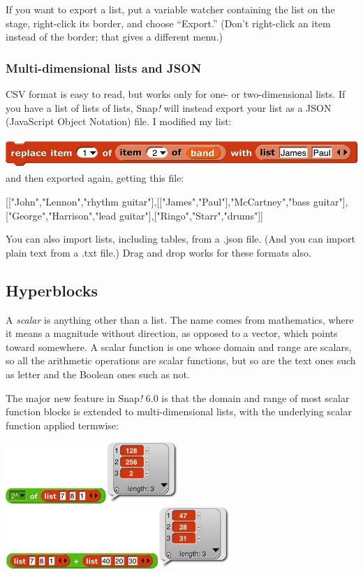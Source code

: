 If you want to export a list, put a variable watcher containing the list
on the stage, right-click its border, and choose ``Export.'' (Don't
right-click an item instead of the border; that gives a different menu.)

\subsubsection{Multi-dimensional lists and
JSON}\label{multi-dimensional-lists-and-json}

CSV format is easy to read, but works only for one- or two-dimensional
lists. If you have a list of lists of lists, Snap\emph{!} will instead
export your list as a JSON (JavaScript Object Notation) file. I modified
my list:

\includegraphics[width=6.33333in,height=0.44792in]{media/image608.png}and
then exported again, getting this file:

{[}{[}"John","Lennon","rhythm
guitar"{]},{[}{[}"James","Paul"{]},"McCartney","bass
guitar"{]},{[}"George","Harrison","lead
guitar"{]},{[}"Ringo","Starr","drums"{]}{]}

You can also import lists, including tables, from a .json file. (And you
can import plain text from a .txt file.) Drag and drop works for these
formats also.

\subsection{\texorpdfstring{\hfill\break
Hyperblocks}{ Hyperblocks}}\label{hyperblocks}

A \emph{scalar} is anything other than a list. The name comes from
mathematics, where it means a magnitude without direction, as opposed to
a vector, which points toward somewhere. A scalar function is one whose
domain and range are scalars, so all the arithmetic operations are
scalar functions, but so are the text ones such as letter and the
Boolean ones such as not.

The major new feature in Snap\emph{!} 6.0 is that the domain and range
of most scalar function blocks is extended to multi-dimensional lists,
with the underlying scalar function applied termwise:

\includegraphics[width=2.5625in,height=0.91667in]{media/image609.png}\includegraphics[width=3.34028in,height=0.91667in]{media/image610.png}

